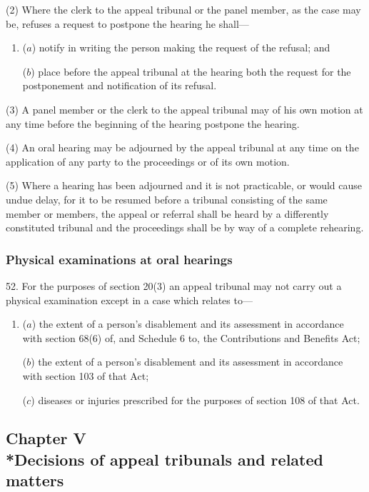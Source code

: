 \documentclass[12pt,a4paper]{article}
\begin{document}
(2) Where the clerk to the appeal tribunal or the panel member, as the case may be, refuses a request to postpone the hearing he shall—
\begin{enumerate}\item[]
($a$) notify in writing the person making the request of the refusal; and

($b$) place before the appeal tribunal at the hearing both the request for the postponement and notification of its refusal.
\end{enumerate}

(3) A panel member or the clerk to the appeal tribunal may of his own motion at any time before the beginning of the hearing postpone the hearing.

(4) An oral hearing may be adjourned by the appeal tribunal at any time on the application of any party to the proceedings or of its own motion.

(5) Where a hearing has been adjourned and it is not practicable, or would cause undue delay, for it to be resumed before a tribunal consisting of the same member or members, the appeal or referral shall be heard by a differently constituted tribunal and the proceedings shall be by way of a complete rehearing.

\subsubsection[52. Physical examinations at oral hearings]{Physical examinations at oral hearings}

52.  For the purposes of section 20(3) an appeal tribunal may not carry out a physical examination except in a case which relates to—
\begin{enumerate}\item[]
($a$) the extent of a person’s disablement and its assessment in accordance with section 68(6) of, and Schedule 6 to, the Contributions and Benefits Act;

($b$) the extent of a person’s disablement and its assessment in accordance with section 103 of that Act;

($c$) diseases or injuries prescribed for the purposes of section 108 of that Act.
\end{enumerate}

\subsection[Chapter V --- Decisions of appeal tribunals and related matters]{Chapter V\\*Decisions of appeal tribunals and related matters}
\end{document}
